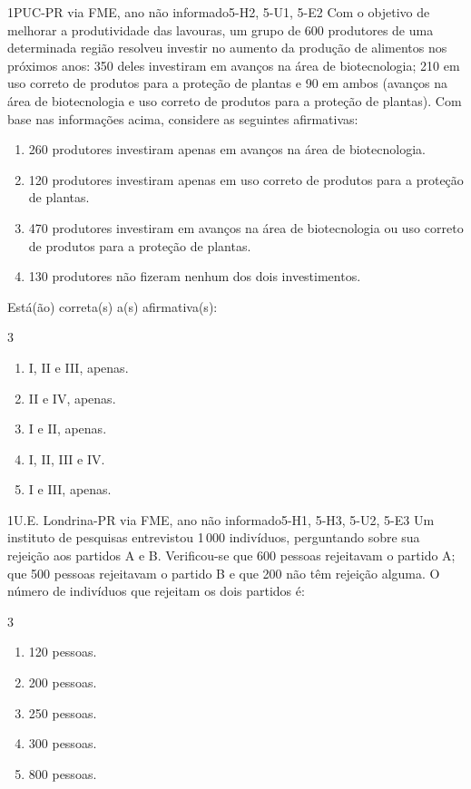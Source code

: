 \begin{questao}{1}{PUC-PR via FME, ano não informado}{5-H2, 5-U1, 5-E2}\label{u5:pucpr11}
Com o objetivo de melhorar a produtividade das lavouras, um grupo de 600 produtores de uma determinada região resolveu investir no aumento da produção de alimentos nos próximos anos: 350 deles investiram em avanços na área de biotecnologia; 210 em uso correto de produtos para a proteção de plantas e 90 em ambos (avanços na área de biotecnologia e uso correto de produtos para a proteção de plantas). Com base nas informações acima, considere as seguintes afirmativas:
\begin{enumerate}[label=\Roman*.]
  \item 260 produtores investiram apenas em avanços na área de biotecnologia.
  \item 120 produtores investiram apenas em uso correto de produtos para a proteção de plantas.
  \item 470 produtores investiram em avanços na área de biotecnologia ou uso correto de produtos para a proteção de plantas.
  \item 130 produtores não fizeram nenhum dos dois investimentos.
\end{enumerate}
Está(ão) correta(s) a(s) afirmativa(s):
\begin{multicols}{3}
\begin{enumerate}[label=\alph*)]
  \item I, II e III, apenas.
  \item II e IV, apenas.
  \item I e II, apenas.
  \item I, II, III e IV.
  \item I e III, apenas.
\end{enumerate}
\end{multicols}
\end{questao}

\begin{questao}{1}{U.E. Londrina-PR via FME, ano não informado}{5-H1, 5-H3, 5-U2, 5-E3}\label{u5:uel7}
Um instituto de pesquisas entrevistou 1\,000 indivíduos, perguntando sobre sua rejeição aos partidos A e B. Verificou-se que 600 pessoas rejeitavam o partido A; que 500 pessoas rejeitavam o partido B e que 200 não têm rejeição alguma. O número de indivíduos que rejeitam os dois partidos é:
\begin{multicols}{3}
\begin{enumerate}[label=\alph*)]
  \item 120 pessoas.
  \item 200 pessoas.
  \item 250 pessoas.
  \item 300 pessoas.
  \item 800 pessoas.
\end{enumerate}
\end{multicols}
\end{questao}

